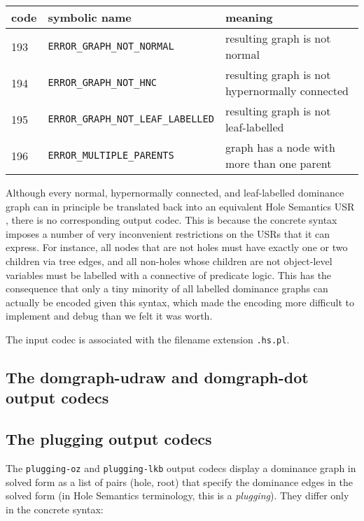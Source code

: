 \begin{tabular}{lll}
code & symbolic name & meaning \\ \hline
193 &  \verb?ERROR_GRAPH_NOT_NORMAL? & resulting graph is not normal \\
194 &  \verb?ERROR_GRAPH_NOT_HNC? & resulting graph is not hypernormally
connected \\
195 &  \verb?ERROR_GRAPH_NOT_LEAF_LABELLED? & resulting graph is not
leaf-labelled \\
196 &  \verb?ERROR_MULTIPLE_PARENTS? & graph has a node with more than one
parent 
\end{tabular}

Although every normal, hypernormally connected, and leaf-labelled
dominance graph can in principle be translated back into an equivalent
Hole Semantics USR \cite{KolNieTha03}, there is no corresponding
output codec. This is because the concrete syntax imposes a number of
very inconvenient restrictions on the USRs that it can express. For
instance, all nodes that are not holes must have exactly one or two
children via tree edges, and all non-holes whose children are not
object-level variables must be labelled with a connective of predicate
logic. This has the consequence that only a tiny minority of all
labelled dominance graphs can actually be encoded given this syntax,
which made the encoding more difficult to implement and debug than we
felt it was worth.

The input codec is associated with the filename extension \verb?.hs.pl?.




\subsection{The domgraph-udraw and domgraph-dot output codecs}






\subsection{The plugging output codecs}

The \verb?plugging-oz? and \verb?plugging-lkb? output codecs display a
dominance graph in solved form as a list of pairs (hole, root) that
specify the dominance edges in the solved form (in Hole Semantics
terminology, this is a \emph{plugging}). They differ only in the
concrete syntax:

